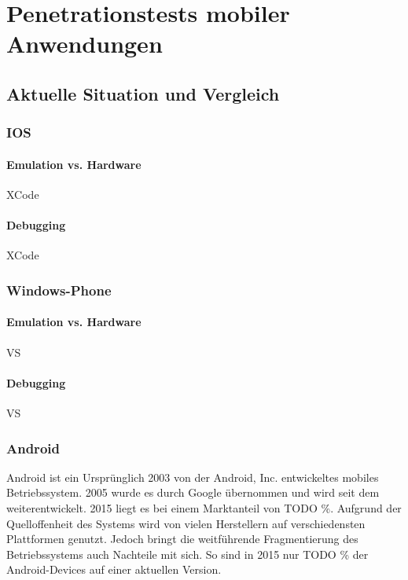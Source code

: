 \chapter{Penetrationstests mobiler Anwendungen}
	\section{Aktuelle Situation und Vergleich}
		\subsection{IOS}
			\subsubsection{Emulation vs. Hardware}
			XCode
			\subsubsection{Debugging}
			XCode
		\subsection{Windows-Phone}
			\subsubsection{Emulation vs. Hardware}
			VS
			\subsubsection{Debugging}
			VS	
		\subsection{Android}
			Android ist ein Ursprünglich 2003 von der Android, Inc. entwickeltes mobiles Betriebssystem. 2005 wurde es durch Google übernommen und wird seit dem weiterentwickelt. 2015 liegt es bei einem Marktanteil von TODO \%. Aufgrund der Quelloffenheit des Systems wird von vielen Herstellern auf verschiedensten Plattformen genutzt. Jedoch bringt die weitführende Fragmentierung des Betriebssystems auch Nachteile mit sich. So sind in 2015 nur TODO \% der Android-Devices auf einer aktuellen Version.\cite{Drake2014}
